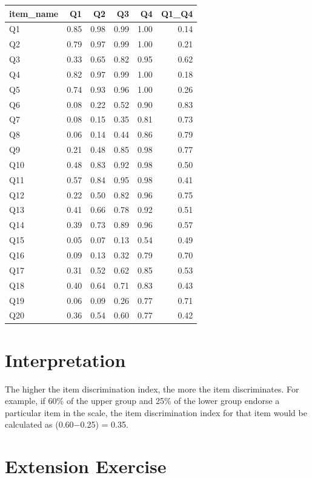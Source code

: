 \documentclass[
  letterpaper,
  DIV=11,
  numbers=noendperiod]{scrreprt}
\begin{document}
\begin{longtable}[]{@{}lrrrrr@{}}
\toprule\noalign{}
item\_name & Q1 & Q2 & Q3 & Q4 & Q1\_Q4 \\
\midrule\noalign{}
\endhead
\bottomrule\noalign{}
\endlastfoot
Q1 & 0.85 & 0.98 & 0.99 & 1.00 & 0.14 \\
Q2 & 0.79 & 0.97 & 0.99 & 1.00 & 0.21 \\
Q3 & 0.33 & 0.65 & 0.82 & 0.95 & 0.62 \\
Q4 & 0.82 & 0.97 & 0.99 & 1.00 & 0.18 \\
Q5 & 0.74 & 0.93 & 0.96 & 1.00 & 0.26 \\
Q6 & 0.08 & 0.22 & 0.52 & 0.90 & 0.83 \\
Q7 & 0.08 & 0.15 & 0.35 & 0.81 & 0.73 \\
Q8 & 0.06 & 0.14 & 0.44 & 0.86 & 0.79 \\
Q9 & 0.21 & 0.48 & 0.85 & 0.98 & 0.77 \\
Q10 & 0.48 & 0.83 & 0.92 & 0.98 & 0.50 \\
Q11 & 0.57 & 0.84 & 0.95 & 0.98 & 0.41 \\
Q12 & 0.22 & 0.50 & 0.82 & 0.96 & 0.75 \\
Q13 & 0.41 & 0.66 & 0.78 & 0.92 & 0.51 \\
Q14 & 0.39 & 0.73 & 0.89 & 0.96 & 0.57 \\
Q15 & 0.05 & 0.07 & 0.13 & 0.54 & 0.49 \\
Q16 & 0.09 & 0.13 & 0.32 & 0.79 & 0.70 \\
Q17 & 0.31 & 0.52 & 0.62 & 0.85 & 0.53 \\
Q18 & 0.40 & 0.64 & 0.71 & 0.83 & 0.43 \\
Q19 & 0.06 & 0.09 & 0.26 & 0.77 & 0.71 \\
Q20 & 0.36 & 0.54 & 0.60 & 0.77 & 0.42 \\
\end{longtable}

\hypertarget{interpretation}{%
\section{Interpretation}\label{interpretation}}

The higher the item discrimination index, the more the item
discriminates. For example, if 60\% of the upper group and 25\% of the
lower group endorse a particular item in the scale, the item
discrimination index for that item would be calculated as (0.60−0.25) =
0.35.

\hypertarget{extension-exercise}{%
\section{Extension Exercise}\label{extension-exercise}}
\end{document}
